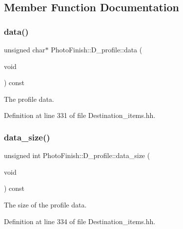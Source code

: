\subsection{Member Function Documentation}
\mbox{\label{class_photo_finish_1_1_d__profile_ab791e89b8333a60a13cdbb1b9579291c}} 
\subsubsection{\texorpdfstring{data()}{data()}}
{\footnotesize\ttfamily unsigned char$\ast$ Photo\+Finish\+::\+D\+\_\+profile\+::data (\begin{DoxyParamCaption}\item[{void}]{ }\end{DoxyParamCaption}) const\hspace{0.3cm}{\ttfamily [inline]}}



The profile data. 



Definition at line 331 of file Destination\+\_\+items.\+hh.

\mbox{\label{class_photo_finish_1_1_d__profile_ab0907773b818b9d19c47e5aa4558b476}} 
\subsubsection{\texorpdfstring{data\+\_\+size()}{data\_size()}}
{\footnotesize\ttfamily unsigned int Photo\+Finish\+::\+D\+\_\+profile\+::data\+\_\+size (\begin{DoxyParamCaption}\item[{void}]{ }\end{DoxyParamCaption}) const\hspace{0.3cm}{\ttfamily [inline]}}



The size of the profile data. 



Definition at line 334 of file Destination\+\_\+items.\+hh.

